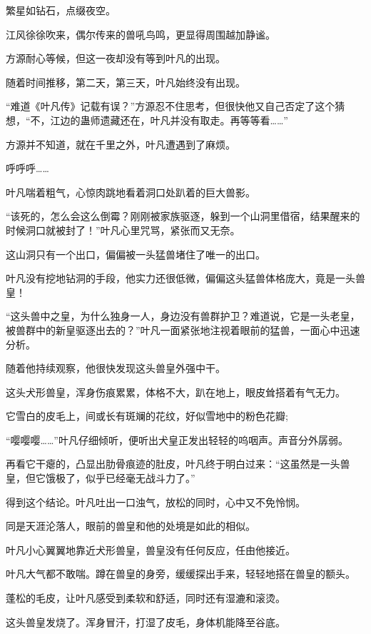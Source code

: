
\begin{this_body}

繁星如钻石，点缀夜空。

江风徐徐吹来，偶尔传来的兽吼鸟鸣，更显得周围越加静谧。

方源耐心等候，但这一夜却没有等到叶凡的出现。

随着时间推移，第二天，第三天，叶凡始终没有出现。

“难道《叶凡传》记载有误？”方源忍不住思考，但很快他又自己否定了这个猜想，“不，江边的蛊师遗藏还在，叶凡并没有取走。再等等看……”

方源并不知道，就在千里之外，叶凡遭遇到了麻烦。

呼呼呼……

叶凡喘着粗气，心惊肉跳地看着洞口处趴着的巨大兽影。

“该死的，怎么会这么倒霉？刚刚被家族驱逐，躲到一个山洞里借宿，结果醒来的时候洞口就被封了！”叶凡心里咒骂，紧张而又无奈。

这山洞只有一个出口，偏偏被一头猛兽堵住了唯一的出口。

叶凡没有挖地钻洞的手段，他实力还很低微，偏偏这头猛兽体格庞大，竟是一头兽皇！

“这头兽中之皇，为什么独身一人，身边没有兽群护卫？难道说，它是一头老皇，被兽群中的新皇驱逐出去的？”叶凡一面紧张地注视着眼前的猛兽，一面心中迅速分析。

随着他持续观察，他很快发现这头兽皇外强中干。

这头犬形兽皇，浑身伤痕累累，体格不大，趴在地上，眼皮耸搭着有气无力。

它雪白的皮毛上，间或长有斑斓的花纹，好似雪地中的粉色花瓣;

“嘤嘤嘤……”叶凡仔细倾听，便听出犬皇正发出轻轻的呜咽声。声音分外孱弱。

再看它干瘪的，凸显出肋骨痕迹的肚皮，叶凡终于明白过来：“这虽然是一头兽皇，但它饿极了，似乎已经毫无战斗力了。”

得到这个结论。叶凡吐出一口浊气，放松的同时，心中又不免怜悯。

同是天涯沦落人，眼前的兽皇和他的处境是如此的相似。

叶凡小心翼翼地靠近犬形兽皇，兽皇没有任何反应，任由他接近。

叶凡大气都不敢喘。蹲在兽皇的身旁，缓缓探出手来，轻轻地搭在兽皇的额头。

蓬松的毛皮，让叶凡感受到柔软和舒适，同时还有湿漉和滚烫。

这头兽皇发烧了。浑身冒汗，打湿了皮毛，身体机能降至谷底。


\end{this_body}
